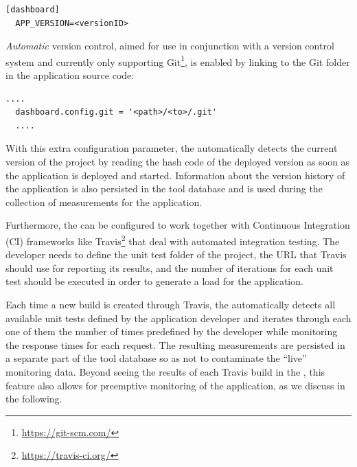 \documentclass{sig-alternate-05-2015}
\begin{document}
  \begin{lstlisting}[style=custompython]
  [dashboard]
  APP_VERSION=<versionID>
  \end{lstlisting}
  
  \textit{Automatic} version control, aimed for use in conjunction with a version control system and currently only supporting Git\footnote{\url{https://git-scm.com/}}, is enabled by linking to the Git folder in the application source code: 
  
  \begin{lstlisting}[style=custompython]
  ....
  dashboard.config.git = '<path>/<to>/.git'
  ....
  \end{lstlisting}  
  
  With this extra configuration parameter, the \tool automatically detects the current version of the project by reading the hash code of the deployed version as soon as the application is deployed and started. Information about the version history of the application is also persisted in the tool database and is used during the collection of measurements for the application.
  
  Furthermore, the \tool can be configured to work together with Continuous Integration (CI) frameworks like Travis\footnote{\url{https://travis-ci.org/}} that deal with automated integration testing.
  The developer needs to define the unit test folder of the project, the URL that Travis should use for reporting its results, and the number of iterations for each unit test should be executed in order to generate a load for the application. 
  
  Each time a new build is created through Travis, the \tool automatically detects all available unit tests defined by the application developer and iterates through each one of them the number of times predefined by the developer while monitoring the response times for each request. The resulting measurements are persisted in a separate part of the tool database so as not to contaminate the ``live'' monitoring data. Beyond seeing the results of each Travis build in the \tool, this feature also allows for preemptive monitoring of the application, as we discuss in the following.      
  
  
\end{document}
